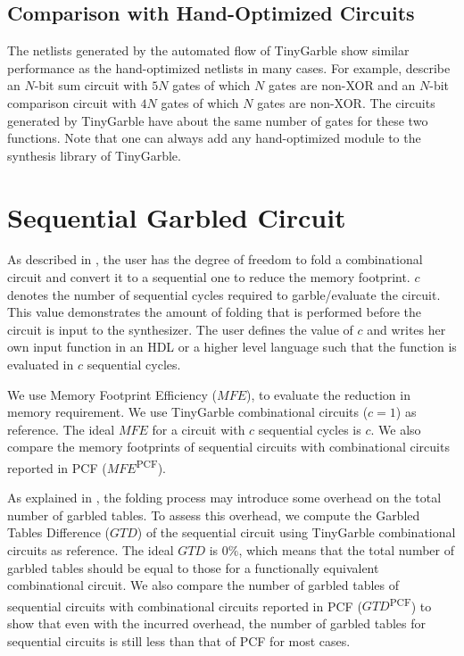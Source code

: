 \subsection{Comparison with Hand-Optimized Circuits}
The netlists generated by the automated flow of TinyGarble show similar performance as the hand-optimized netlists in many cases.
For example, \cite{kolesnikov2009improved} describe an $N$-bit sum circuit with $5N$ gates of which $N$ gates are non-XOR and an $N$-bit comparison circuit with $4N$ gates of which $N$ gates are non-XOR.
The circuits generated by TinyGarble have about the same number of gates for these two functions.
Note that one can always add any hand-optimized module to the synthesis library of TinyGarble.

\section{Sequential Garbled Circuit}
As described in , the user has the degree of freedom to fold a combinational circuit and convert it to a sequential one to reduce the memory footprint.
$c$ denotes the number of sequential cycles required to garble/evaluate the circuit.
This value demonstrates the amount of folding that is performed before the circuit is input to the synthesizer.
The user defines the value of $c$ and writes her own input function in an HDL or a higher level language such that the function is evaluated in $c$ sequential cycles.

We use Memory Footprint Efficiency ($\mathit{MFE}$), to evaluate the reduction in memory requirement.
We use TinyGarble combinational circuits ($c=1$) as reference.
The ideal $\mathit{MFE}$ for a circuit with $c$ sequential cycles is $c$.
We also compare the memory footprints of sequential circuits with combinational circuits reported in PCF ($\mathit{MFE}$\textsuperscript{PCF}).

As explained in , the folding process may introduce some overhead on the total number of garbled tables.
To assess this overhead, we compute the Garbled Tables Difference ($\mathit{GTD}$) of the sequential circuit using TinyGarble combinational circuits as reference.
The ideal $\mathit{GTD}$ is $0\%$, which means that the total number of garbled tables should be equal to those for a functionally equivalent combinational circuit.
We also compare the number of garbled tables of sequential circuits with combinational circuits reported in PCF ($\mathit{GTD}$\textsuperscript{PCF}) to show that even with the incurred overhead, the number of garbled tables for sequential circuits is still less than that of PCF for most cases.

